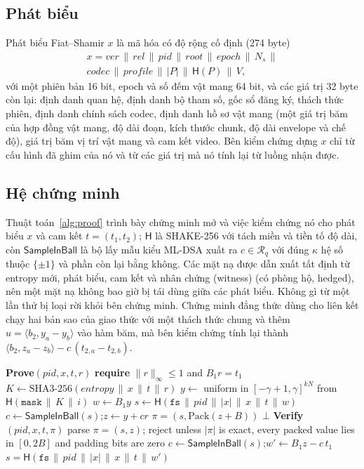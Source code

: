 \documentclass[journal]{IEEEtran}
\newcommand{\Rq}{\mathcal{R}_q}
\newcommand{\norm}[1]{\lVert #1 \rVert}
\newcommand{\Hash}{\mathsf{H}}
\newcommand{\pid}{\mathit{pid}}
\newcommand{\SIB}{\mathsf{SampleInBall}}
\begin{document}
\subsection{Phát biểu}
Phát biểu Fiat--Shamir $x$ là mã hóa có độ rộng cố định (274 byte)
\begin{multline*}
x=\mathit{ver}\,\|\,\mathit{rel}\,\|\,\pid\,\|\,\mathit{root}\,\|\,\mathit{epoch}\,\|\,N_s\,\|\\
\mathit{codec}\,\|\,\mathit{profile}\,\|\,|P|\,\|\,\Hash(P)\,\|\,V,
\end{multline*}
với một phiên bản 16 bit, epoch và số đếm vật mang 64 bit, và các giá trị 32
byte còn lại: định danh quan hệ, định danh bộ tham số, gốc sổ đăng ký, thách
thức phiên, định danh chính sách codec, định danh hồ sơ vật mang (một giá trị
băm của hợp đồng vật mang, độ dài đoạn, kích thước chunk, độ dài envelope và chế
độ), giá trị băm vị trí vật mang và cam kết video. Bên kiểm chứng dựng $x$ chỉ
từ cấu hình đã ghim của nó và từ các giá trị mà nó tính lại từ luồng nhận được.

\subsection{Hệ chứng minh}
\label{sec:proof}
Thuật toán~\ref{alg:proof} trình bày chứng minh mở và việc kiểm chứng nó cho
phát biểu $x$ và cam kết $t=(t_1,t_2)$; $\Hash$ là SHAKE-256 với tách miền và
tiền tố độ dài, còn $\SIB$ là bộ lấy mẫu kiểu ML-DSA xuất ra $c\in\Rq$ với đúng
$\kappa$ hệ số thuộc $\{\pm1\}$ và phần còn lại bằng không. Các mặt nạ được dẫn
xuất tất định từ entropy mới, phát biểu, cam kết và nhân chứng (witness) (có
phòng hộ, hedged), nên một mặt nạ không bao giờ bị tái dùng giữa các phát biểu.
Không gì từ một lần thử bị loại rời khỏi bên chứng minh. Chứng minh đẳng thức
dùng cho liên kết chạy hai bản sao của giao thức với một thách thức chung và
thêm $u=\langle b_2,y_a-y_b\rangle$ vào hàm băm, mà bên kiểm chứng tính lại
thành $\langle b_2,z_a-z_b\rangle-c\,(t_{2,a}-t_{2,b})$.

\begin{algorithm}[t]
\caption{Chứng minh mở (bên chứng minh) và kiểm chứng.}
\label{alg:proof}
\small
\begin{algorithmic}[1]
\Statex \textbf{Prove}$(\pid, x, t, r)$ 
\State \textbf{require} $\norm{r}_\infty\le1$ and $B_1r=t_1$
\State $K\gets\mathrm{SHA3\mbox{-}256}(\mathit{entropy}\,\|\,x\,\|\,t\,\|\,r)$
  \State $y\gets$ uniform in $[-\gamma+1,\gamma]^{kN}$ from $\Hash(\texttt{mask}\,\|\,K\,\|\,i)$
  \State $w\gets B_1y$
  \State $s\gets\Hash(\texttt{fs}\,\|\,\pid\,\|\,|x|\,\|\,x\,\|\,t\,\|\,w)$ 
  \State $c\gets\SIB(s)$;\quad $z\gets y+cr$
  \If{$\norm{z}_\infty\le B$} \Return $\pi=(s,\mathrm{Pack}(z+B))$ \EndIf
\EndFor
\State \Return $\bot$ 
\Statex
\Statex \textbf{Verify}$(\pid, x, t, \pi)$
\State parse $\pi=(s,z)$; reject unless $|\pi|$ is exact, every packed value
  lies in $[0,2B]$ and padding bits are zero
\State $c\gets\SIB(s)$;\quad $w'\gets B_1z-c\,t_1$
\State \Return $s=\Hash(\texttt{fs}\,\|\,\pid\,\|\,|x|\,\|\,x\,\|\,t\,\|\,w')$
\end{algorithmic}
\end{algorithm}
\end{document}
